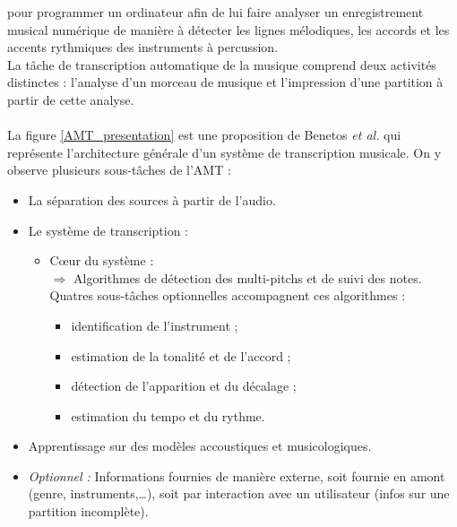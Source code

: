 pour programmer un ordinateur afin de lui faire analyser un enregistrement
musical numérique de manière à détecter les lignes mélodiques, les accords et
les accents rythmiques des instruments à percussion.\\
La tâche de transcription automatique de la musique comprend deux activités
distinctes : l'analyse d'un morceau de musique et l'impression d'une partition
à partir de cette analyse.\\\\
La figure \ref{AMT_presentation} est une proposition de Benetos \textit{et al.}
\cite{future_directions} qui représente l'architecture générale d'un système de
transcription musicale. On y observe plusieurs sous-tâches de l’AMT :
\begin{itemize}
	\item La séparation des sources à partir de l’audio.
	\item Le système de transcription :
	\begin{itemize}
		\item Cœur du système :\\
		$\Rightarrow$ Algorithmes de détection des multi-pitchs et de suivi des \tab notes.\\
		Quatres sous-tâches optionnelles accompagnent ces algorithmes :
		\begin{itemize}
			\item identification de l'instrument ;
			\item estimation de la tonalité et de l'accord ;
			\item détection de l'apparition et du décalage ;
			\item estimation du tempo et du rythme.
		\end{itemize}
	\end{itemize}
	\item Apprentissage sur des modèles accoustiques et musicologiques.
	\item \textit{Optionnel :} Informations fournies de manière externe, soit
        fournie en amont (genre, instruments,…), soit par interaction avec un
        utilisateur (infos sur une partition incomplète).
\end{itemize}
